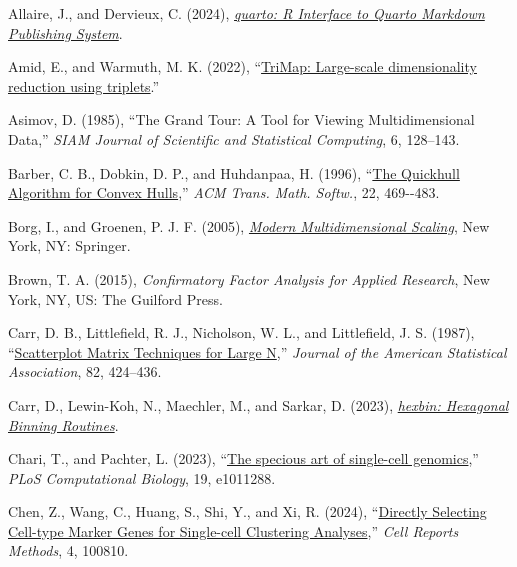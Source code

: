 \documentclass[
  11pt,
  a4paper,
]{report}
\newlength{\cslhangindent}
\newenvironment{CSLReferences}[2] %
 {\begin{list}{}{%
  \setlength{\itemindent}{0pt}
  \setlength{\leftmargin}{0pt}
  \setlength{\parsep}{0pt}
  \ifodd #1
   \setlength{\leftmargin}{\cslhangindent}
   \setlength{\itemindent}{-1\cslhangindent}
  \fi
  \setlength{\itemsep}{#2\baselineskip}}}
 {\end{list}}
\begin{document}
\label{refs}
\begin{CSLReferences}{1}{0}
Allaire, J., and Dervieux, C. (2024),
\emph{\href{/url\%7Bhttps://CRAN.R-project.org/package=quarto\%7D.}{{quarto:
R Interface to Quarto Markdown Publishing System}}}.

Amid, E., and Warmuth, M. K. (2022),
{``\href{https://arxiv.org/abs/1910.00204}{TriMap: Large-scale
dimensionality reduction using triplets}.''}

Asimov, D. (1985), {``{T}he {G}rand {T}our: {A} {T}ool for {V}iewing
{M}ultidimensional {D}ata,''} \emph{SIAM Journal of Scientific and
Statistical Computing}, 6, 128--143.

Barber, C. B., Dobkin, D. P., and Huhdanpaa, H. (1996),
{``\href{/url\%7Bhttps://doi.org/10.1145/235815.235821\%7D.}{{The
Quickhull Algorithm for Convex Hulls}},''} \emph{ACM Trans. Math.
Softw.}, 22, 469-\/-483.

Borg, I., and Groenen, P. J. F. (2005),
\emph{\href{/url\%7Bhttps://doi.org/10.1007/0-387-28981-X\%7D.}{{Modern
Multidimensional Scaling}}}, New York, NY: Springer.

Brown, T. A. (2015), \emph{{Confirmatory Factor Analysis for Applied
Research}}, New York, NY, US: {The Guilford Press}.

Carr, D. B., Littlefield, R. J., Nicholson, W. L., and Littlefield, J.
S. (1987),
{``\href{/url\%7Bhttp://www.jstor.org/stable/2289444\%7D.}{{Scatterplot
Matrix Techniques for Large N}},''} \emph{Journal of the American
Statistical Association}, 82, 424--436.

Carr, D., Lewin-Koh, N., Maechler, M., and Sarkar, D. (2023),
\emph{\href{/url\%7Bhttps://CRAN.R-project.org/package=hexbin\%7D.}{{hexbin:
Hexagonal Binning Routines}}}.

Chari, T., and Pachter, L. (2023),
{``\href{https://doi.org/10.1371/journal.pcbi.1011288}{The specious art
of single-cell genomics},''} \emph{PLoS Computational Biology}, 19,
e1011288.

Chen, Z., Wang, C., Huang, S., Shi, Y., and Xi, R. (2024),
{``\href{/url\%7Bhttps://www.sciencedirect.com/science/article/pii/S2667237524001735\%7D.}{{Directly
Selecting Cell-type Marker Genes for Single-cell Clustering
Analyses}},''} \emph{Cell Reports Methods}, 4, 100810.


\end{CSLReferences}
\end{document}
